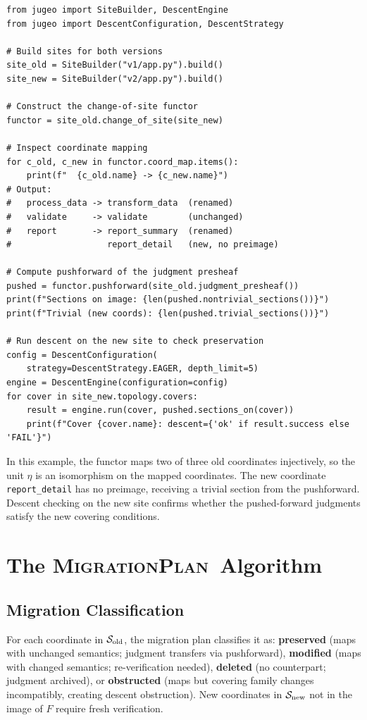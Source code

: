 \documentclass[11pt]{article}
\newcommand{\MigPlan}{\textsc{MigrationPlan}}
\newcommand{\SiteOld}{\Site_{\mathrm{old}}}
\newcommand{\SiteNew}{\Site_{\mathrm{new}}}
\newcommand{\FunctorF}{F}
\begin{document}
\begin{lstlisting}[style=jugeo-python]
from jugeo import SiteBuilder, DescentEngine
from jugeo import DescentConfiguration, DescentStrategy

# Build sites for both versions
site_old = SiteBuilder("v1/app.py").build()
site_new = SiteBuilder("v2/app.py").build()

# Construct the change-of-site functor
functor = site_old.change_of_site(site_new)

# Inspect coordinate mapping
for c_old, c_new in functor.coord_map.items():
    print(f"  {c_old.name} -> {c_new.name}")
# Output:
#   process_data -> transform_data  (renamed)
#   validate     -> validate        (unchanged)
#   report       -> report_summary  (renamed)
#                   report_detail   (new, no preimage)

# Compute pushforward of the judgment presheaf
pushed = functor.pushforward(site_old.judgment_presheaf())
print(f"Sections on image: {len(pushed.nontrivial_sections())}")
print(f"Trivial (new coords): {len(pushed.trivial_sections())}")

# Run descent on the new site to check preservation
config = DescentConfiguration(
    strategy=DescentStrategy.EAGER, depth_limit=5)
engine = DescentEngine(configuration=config)
for cover in site_new.topology.covers:
    result = engine.run(cover, pushed.sections_on(cover))
    print(f"Cover {cover.name}: descent={'ok' if result.success else 'FAIL'}")
\end{lstlisting}

In this example, the functor maps two of three old coordinates injectively,
so the unit $\eta$ is an isomorphism on the mapped coordinates.  The
new coordinate \texttt{report\_detail} has no preimage, receiving a trivial
section from the pushforward.  Descent checking on the new site confirms
whether the pushed-forward judgments satisfy the new covering conditions.

\section{The \MigPlan\ Algorithm}\label{sec:mig-plan}

\subsection{Migration Classification}
For each coordinate in $\SiteOld$, the migration plan classifies it as:
\textbf{preserved} (maps with unchanged semantics; judgment transfers via
pushforward), \textbf{modified} (maps with changed semantics;
re-verification needed), \textbf{deleted} (no counterpart; judgment
archived), or \textbf{obstructed} (maps but covering family changes
incompatibly, creating descent obstruction).  New coordinates in $\SiteNew$
not in the image of $\FunctorF$ require fresh verification.
\end{document}
